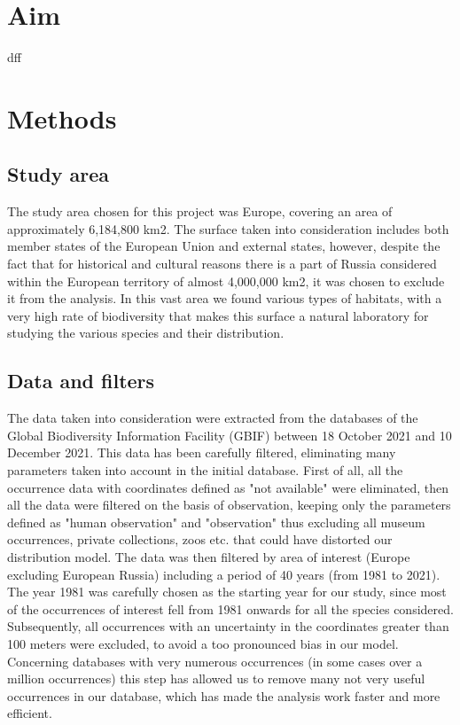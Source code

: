 \documentclass[12pt,a4paper]{article}
\begin{document}
\newpage
\section{Aim}
dff

\newpage
\section{Methods}
\subsection{Study area}
The study area chosen for this project was Europe, covering an area of approximately 6,184,800 km2.
The surface taken into consideration includes both member states of the European Union and external states, however, despite the fact that for historical and cultural reasons there is a part of Russia considered within the European territory of almost 4,000,000 km2, it was chosen to exclude it from the analysis.
In this vast area we found various types of habitats, with a very high rate of biodiversity that makes this surface a natural laboratory for studying the various species and their distribution.

\subsection{Data and filters}
The data taken into consideration were extracted from the databases of the Global Biodiversity Information Facility (GBIF) \citep{gbif} between 18 October 2021 and 10 December 2021.
This data has been carefully filtered, eliminating many parameters taken into account in the initial database.
First of all, all the occurrence data with coordinates defined as "not available" were eliminated, then all the data were filtered on the basis of observation, keeping only the parameters defined as "human observation" and "observation" thus excluding all museum occurrences, private collections, zoos etc. that could have distorted our distribution model.
The data was then filtered by area of interest (Europe excluding European Russia) including a period of 40 years (from 1981 to 2021).
The year 1981 was carefully chosen as the starting year for our study, since most of the occurrences of interest fell from 1981 onwards for all the species considered.
Subsequently, all occurrences with an uncertainty in the coordinates greater than 100 meters were excluded, to avoid a too pronounced bias in our model.
Concerning databases with very numerous occurrences (in some cases over a million occurrences) this step has allowed us to remove many not very useful occurrences in our database, which has made the analysis work faster and more efficient.
\end{document}
